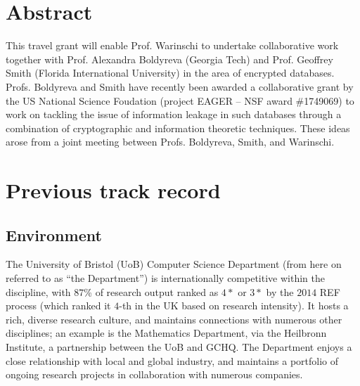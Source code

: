 
\section{Abstract}
\label{sec:abs}

This travel grant will enable Prof. Warinschi to undertake collaborative work together with Prof. Alexandra Boldyreva (Georgia Tech) and Prof. Geoffrey Smith (Florida International University) in the area of encrypted databases.
Profs. Boldyreva and Smith have recently been awarded a collaborative grant by the US National Science Foudation 
(project EAGER -- NSF award \#1749069) to work on tackling the issue of information leakage in such databases through a combination of cryptographic and information theoretic techniques. 
These ideas arose from a joint meeting between Profs. Boldyreva, Smith, and Warinschi. 


\iffalse
Specifically, the goal is to develop a principled approach to quantifying and understanding the inherent information leakage in such systems.  
The state of the art is, essentially, that 
\fi






\section{Previous track record}
\label{sec:prev}


\iffalse
\subsection{Environment}
\label{sec:prev_env}

The University of Bristol (UoB) Computer Science Department (from here 
on referred to as ``the Department'') is internationally competitive
within the discipline, with $87$\% of research output ranked as $4*$ 
or $3*$ by the $2014$ REF process (which ranked it $4$-th in the UK
based on research intensity).  It hosts a rich, diverse research 
culture, and maintains connections with numerous other disciplines; an
example is the Mathematics Department, via the Heilbronn Institute, a 
partnership between the UoB and GCHQ.  The Department enjoys a close 
relationship with local and global industry, and maintains a portfolio
of ongoing research projects in collaboration with numerous companies.  

